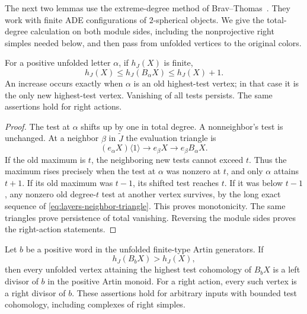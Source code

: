 The next two lemmas use the extreme-degree method of
Brav--Thomas~\cite[Lemma~3.3 and Proposition~3.1]{BravThomas2011}.
They work with finite ADE configurations of $2$-spherical objects.
We give the total-degree calculation on both module sides, including
the nonprojective right simples needed below, and then pass from
unfolded vertices to the original colors.

\begin{lemma}\label{lem:layers-height-change}
For a positive unfolded letter $\alpha$, if $h_J(X)$ is finite,
\[
 h_J(X)\leq h_J(B_\alpha X)\leq h_J(X)+1.
\]
An increase occurs exactly when $\alpha$ is an old highest-test
vertex; in that case it is the only new highest-test vertex.
Vanishing of all tests persists.  The same assertions hold for
right actions.
\end{lemma}

\begin{proof}
The test at $\alpha$ shifts up by one in total degree.  A
nonneighbor's test is unchanged.  At a neighbor $\beta$ in
$\widetilde J$ the evaluation triangle is
\begin{equation}
 (e_\alpha X)\langle1\rangle\longrightarrow e_\beta X
       \longrightarrow e_\beta B_\alpha X.
 \label{eq:layers-neighbor-triangle}
\end{equation}
If the old maximum is $t$, the neighboring new tests cannot
exceed $t$.  Thus the maximum rises precisely when the test at
$\alpha$ was nonzero at $t$, and only $\alpha$ attains $t+1$.
If its old maximum was $t-1$, its shifted test reaches $t$.
If it was below $t-1$, any nonzero old degree-$t$ test at another
vertex survives, by the long exact sequence of
\eqref{eq:layers-neighbor-triangle}.  This proves monotonicity.
The same triangles prove persistence of total vanishing.  Reversing
the module sides proves the right-action statements.
\end{proof}

\begin{lemma}\label{lem:top-divisor}
Let $b$ be a positive word in the unfolded finite-type Artin
generators.  If
\[
 h_J(B_bX)>h_J(X),
\]
then every unfolded vertex attaining the highest test cohomology
of $B_bX$ is a left divisor of $b$ in the positive Artin monoid.
For a right action, every such vertex is a right divisor of $b$.
These assertions hold for arbitrary inputs with bounded test
cohomology, including complexes of right simples.
\end{lemma}

